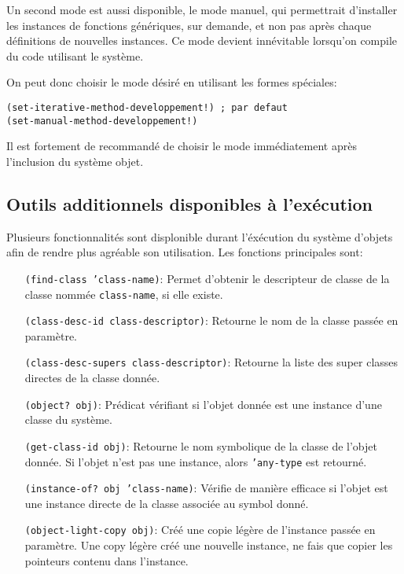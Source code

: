\documentclass[letterpaper,12pt]{book}
\begin{document}
        Un second mode est aussi disponible, le mode manuel, qui
        permettrait d'installer les instances de fonctions génériques,
        sur demande, et non pas après chaque définitions de nouvelles
        instances. Ce mode devient innévitable lorsqu'on compile du
        code utilisant le système.

        On peut donc choisir le mode désiré en utilisant les formes
        spéciales:

        \begin{lstlisting}
(set-iterative-method-developpement!) ; par defaut
(set-manual-method-developpement!)
        \end{lstlisting}

        Il est fortement de recommandé de choisir le mode
        immédiatement après l'inclusion du système objet.

    \subsection{Outils additionnels disponibles à l'exécution}

      Plusieurs fonctionnalités sont displonible durant l'éxécution du
      système d'objets afin de rendre plus agréable son
      utilisation. Les fonctions principales sont:

      \begin{itemize}
      \item[\texttt{(find-class 'class-name)}:] Permet d'obtenir le
        descripteur de classe de la classe nommée
        \texttt{class-name}, si elle existe.
      \item[]
      \item[\texttt{(class-desc-id class-descriptor)}:] Retourne le
        nom de la classe passée en paramètre.
      \item[]
      \item[\texttt{(class-desc-supers class-descriptor)}:] Retourne
        la liste des super classes directes de la classe donnée.
      \item[]
      \item[\texttt{(object? obj)}:] Prédicat vérifiant si l'objet
        donnée est une instance d'une classe du système.
      \item[]
      \item[\texttt{(get-class-id obj)}:] Retourne le nom symbolique
        de la classe de l'objet donnée. Si l'objet n'est pas une
        instance, alors \texttt{'any-type} est retourné.
      \item[]
      \item[\texttt{(instance-of? obj 'class-name)}:] Vérifie de
        manière efficace si l'objet est une instance directe de la
        classe associée au symbol donné.
      \item[]
      \item[\texttt{(object-light-copy obj)}:] Créé une copie légère
        de l'instance passée en paramètre. Une copy légère créé une
        nouvelle instance, ne fais que copier les pointeurs contenu
        dans l'instance.
      \end{itemize}
\end{document}
